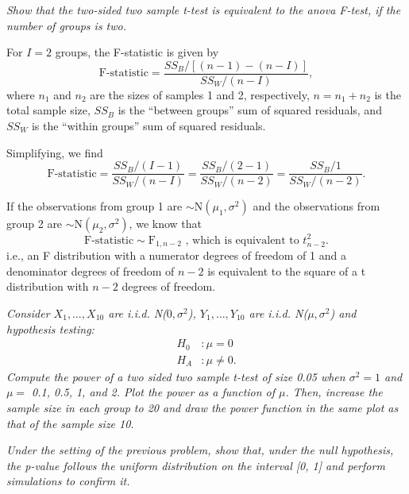 \documentclass[11pt]{exam} %
\begin{document}
\begin{questions}
\titledquestion{} %
\textit{Show that the two-sided two sample t-test is equivalent to the anova F-test, if the number of groups is two.}

For $I=2$ groups, the F-statistic is given by
$$ \text{F-statistic} =  \frac{SS_B / \left[ (n-1) - (n-I) \right]}{SS_W / (n-I)}, $$
where $n_1$ and $n_2$ are the sizes of samples 1 and 2, respectively, $n=n_1+n_2$ is the total sample size, $SS_B$ is the ``between groups'' sum of squared residuals, and $SS_W$ is the ``within groups'' sum of squared residuals.

Simplifying, we find
$$\text{F-statistic} =  \frac{SS_B / (I-1) }{SS_W / (n-I)} = \frac{SS_B / (2-1) }{SS_W / (n-2)} = \frac{SS_B / 1 }{SS_W / (n-2)}.$$

If the observations from group 1 are $\sim \text{N}(\mu_1, \sigma^2)$ and the observations from group 2 are $\sim \text{N}(\mu_2, \sigma^2)$, we know that
$$\text{F-statistic} \sim \text{F}_{1, n-2} \text{ , which is equivalent to }t^2_{n-2}.$$
i.e., an F distribution with a numerator degrees of freedom of 1 and a denominator degrees of freedom of $n-2$ is equivalent to the square of a t distribution with $n-2$ degrees of freedom. 



\titledquestion{} %
\textit{Consider $X_1,\ldots,X_{10}$ are i.i.d. N($0,\sigma^2$), $Y_1,\ldots,Y_{10}$ are i.i.d. N($\mu,\sigma^2$) and hypothesis testing:}
\begin{align*}
H_0 &: \mu = 0\\
H_A &: \mu \neq 0.
\end{align*}
\textit{Compute the power of a two sided two sample t-test of size 0.05 when $\sigma^2 = 1$ and $\mu =$ 0.1, 0.5, 1, and 2. Plot the power as a function of $\mu$. Then, increase the sample size in each group to 20 and draw the power function in the same plot as that of the sample size 10.}



\titledquestion{} %
\textit{Under the setting of the previous problem, show that, under the null hypothesis, the p-value follows the uniform distribution on the interval [0, 1] and perform simulations to confirm it.}




\end{questions}

\listoftodos
\end{document}
